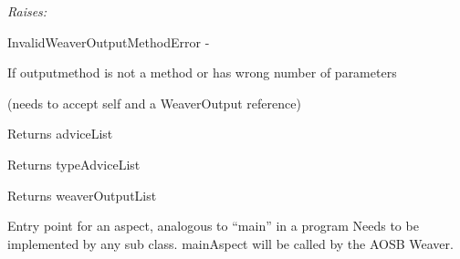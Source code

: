 \documentclass[letterpaper,10pt,english]{sphinxmanual}
\begin{document}
\begin{fulllineitems}
\begin{fulllineitems}
\begin{DUlineblock}{0em}
\item[] \emph{Raises:}
\item[]
\begin{DUlineblock}{\DUlineblockindent}
\item[] InvalidWeaverOutputMethodError -
\item[]
\begin{DUlineblock}{\DUlineblockindent}
\item[] If outputmethod is not a method or has wrong number of parameters
\item[] (needs to accept self and a WeaverOutput reference)
\end{DUlineblock}
\end{DUlineblock}
\end{DUlineblock}

\end{fulllineitems}


\begin{fulllineitems}
\label{modules/index:aosb.core.Aspect.getAdviceList}
Returns adviceList

\end{fulllineitems}


\begin{fulllineitems}
\label{modules/index:aosb.core.Aspect.getTypeAdviceList}
Returns typeAdviceList

\end{fulllineitems}


\begin{fulllineitems}
\label{modules/index:aosb.core.Aspect.getWeaverOutputList}
Returns weaverOutputList

\end{fulllineitems}


\begin{fulllineitems}
\label{modules/index:aosb.core.Aspect.mainAspect}
Entry point for an aspect, analogous to ``main'' in a program
\textbar{} Needs to be implemented by any sub class.
\textbar{} mainAspect will be called by the AOSB Weaver.


\end{fulllineitems}
\end{fulllineitems}
\end{document}
